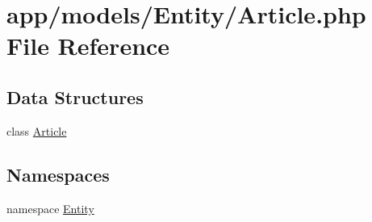 \hypertarget{_article_8php}{\section{app/models/\-Entity/\-Article.php File Reference}
\label{_article_8php}
}
\subsection*{Data Structures}
\begin{DoxyCompactItemize}
\item 
class \hyperlink{class_entity_1_1_article}{Article}
\end{DoxyCompactItemize}
\subsection*{Namespaces}
\begin{DoxyCompactItemize}
\item 
namespace \hyperlink{namespace_entity}{Entity}
\end{DoxyCompactItemize}
